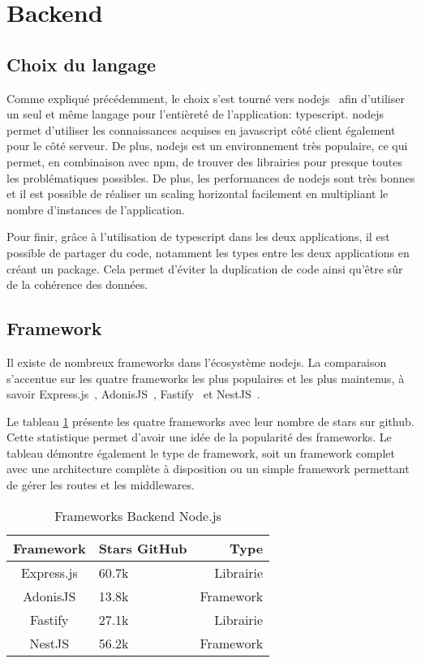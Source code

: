 \section{Backend}

\subsection{Choix du langage}

Comme expliqué précédemment, le choix s'est tourné vers \gls{nodejs}~\cite{nodejs} afin d'utiliser un seul et même langage pour l'entièreté de l'application: \gls{typescript}. \gls{nodejs} permet d'utiliser les connaissances acquises en \gls{javascript} côté client également pour le côté serveur. De plus, \gls{nodejs} est un environnement très populaire, ce qui permet, en combinaison avec \gls{npm}, de trouver des librairies pour presque toutes les problématiques possibles. De plus, les performances de \gls{nodejs} sont très bonnes et il est possible de réaliser un scaling horizontal facilement en multipliant le nombre d'instances de l'application.

Pour finir, grâce à l'utilisation de \gls{typescript} dans les deux applications, il est possible de partager du code, notamment les types entre les deux applications en créant un package. Cela permet d'éviter la duplication de code ainsi qu'être sûr de la cohérence des données.

\subsection{Framework}

Il existe de nombreux frameworks dans l'écosystème \gls{nodejs}. La comparaison s'accentue sur les quatre frameworks les plus populaires et les plus maintenus, à savoir Express.js~\cite{expressjs}, AdonisJS~\cite{adonisjs}, Fastify~\cite{fastify} et NestJS~\cite{nestjs}.

Le tableau \ref{tab:frameworks-backend-nodejs} présente les quatre frameworks avec leur nombre de stars sur \gls{github}. Cette statistique permet d'avoir une idée de la popularité des frameworks. Le tableau démontre également le type de framework, soit un framework complet avec une architecture complète à disposition ou un simple framework permettant de gérer les routes et les middlewares.

\begin{table}[h]
  \begin{center}
    \caption{Frameworks Backend Node.js}
    \label{tab:frameworks-backend-nodejs}
    \begin{tabular}{c|l|r}
      Framework  & Stars GitHub & Type      \\ \hline
      Express.js & 60.7k        & Librairie \\
      AdonisJS   & 13.8k        & Framework \\
      Fastify    & 27.1k        & Librairie \\
      NestJS     & 56.2k        & Framework \\
    \end{tabular}
  \end{center}
\end{table}

